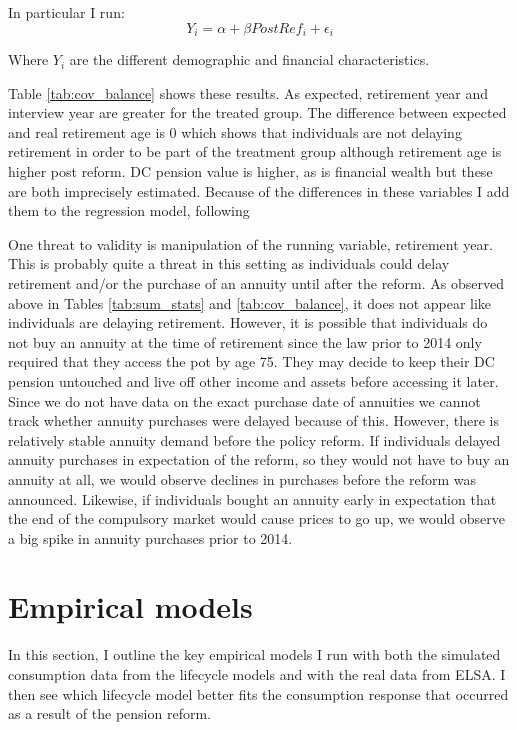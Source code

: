 \documentclass[12pt]{article}
\begin{document}
In particular I run:
\begin{equation*}
    Y_{i} = \alpha + \beta PostRef_{i}  + \epsilon_{i}
\end{equation*}

Where $Y_{i}$ are the different demographic and financial characteristics.



Table \ref{tab:cov_balance} shows these results. As expected, retirement year
and interview year are greater for the treated group. The difference between
expected and real retirement age is 0 which shows that individuals are not
delaying retirement in order to be part of the treatment group although
retirement age is higher post reform. DC pension value is higher, as is
financial wealth but these are both imprecisely estimated. Because of the
differences in these variables I add them to the regression model, following

One threat to validity is manipulation of the running variable, retirement year.
This is probably quite a threat in this setting as individuals could delay
retirement and/or the purchase of an annuity until after the reform. As observed
above in Tables \ref{tab:sum_stats} and \ref{tab:cov_balance}, it does not
appear like individuals are delaying retirement. However, it is possible that
individuals do not buy an annuity at the time of retirement since the law prior
to 2014 only required that they access the pot by age 75. They may decide to
keep their DC pension untouched and live off other income and assets before
accessing it later. Since we do not have data on the exact purchase date of
annuities we cannot track whether annuity purchases were delayed because of
this. However, there is relatively stable annuity demand before the policy
reform. If individuals delayed annuity purchases in expectation of the reform,
so they would not have to buy an annuity at all, we would observe declines in
purchases before the reform was announced. Likewise, if individuals bought an
annuity early in expectation that the end of the compulsory market would cause
prices to go up, we would observe a big spike in annuity purchases prior to
2014.


\section{Empirical models}

In this section, I outline the key empirical models I run with both the simulated
consumption data from the lifecycle models and with the real data from ELSA. I
then see which lifecycle model better fits the consumption response that
occurred as a result of the pension reform.
\end{document}
